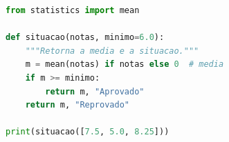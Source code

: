 \documentclass[12pt, a4paper, brazilian]{abntex2}
\begin{document}
\begin{lstlisting}[language=Python]
from statistics import mean

def situacao(notas, minimo=6.0):
    """Retorna a media e a situacao."""
    m = mean(notas) if notas else 0  # media
    if m >= minimo:
        return m, "Aprovado"
    return m, "Reprovado"

print(situacao([7.5, 5.0, 8.25]))
\end{lstlisting}
\end{document}
